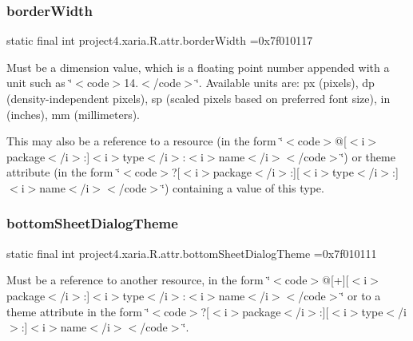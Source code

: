 \subsubsection{\texorpdfstring{border\+Width}{borderWidth}}
{\footnotesize\ttfamily static final int project4.\+xaria.\+R.\+attr.\+border\+Width =0x7f010117\hspace{0.3cm}{\ttfamily [static]}}

Must be a dimension value, which is a floating point number appended with a unit such as \char`\"{}$<$code$>$14.\+5sp$<$/code$>$\char`\"{}. Available units are\+: px (pixels), dp (density-\/independent pixels), sp (scaled pixels based on preferred font size), in (inches), mm (millimeters). 

This may also be a reference to a resource (in the form \char`\"{}$<$code$>$@\mbox{[}$<$i$>$package$<$/i$>$\+:\mbox{]}$<$i$>$type$<$/i$>$\+:$<$i$>$name$<$/i$>$$<$/code$>$\char`\"{}) or theme attribute (in the form \char`\"{}$<$code$>$?\mbox{[}$<$i$>$package$<$/i$>$\+:\mbox{]}\mbox{[}$<$i$>$type$<$/i$>$\+:\mbox{]}$<$i$>$name$<$/i$>$$<$/code$>$\char`\"{}) containing a value of this type. \mbox{\label{classproject4_1_1xaria_1_1R_1_1attr_ae6a88102a1ce06b9b5520fc892ddcf76}} 
\subsubsection{\texorpdfstring{bottom\+Sheet\+Dialog\+Theme}{bottomSheetDialogTheme}}
{\footnotesize\ttfamily static final int project4.\+xaria.\+R.\+attr.\+bottom\+Sheet\+Dialog\+Theme =0x7f010111\hspace{0.3cm}{\ttfamily [static]}}

Must be a reference to another resource, in the form \char`\"{}$<$code$>$@\mbox{[}+\mbox{]}\mbox{[}$<$i$>$package$<$/i$>$\+:\mbox{]}$<$i$>$type$<$/i$>$\+:$<$i$>$name$<$/i$>$$<$/code$>$\char`\"{} or to a theme attribute in the form \char`\"{}$<$code$>$?\mbox{[}$<$i$>$package$<$/i$>$\+:\mbox{]}\mbox{[}$<$i$>$type$<$/i$>$\+:\mbox{]}$<$i$>$name$<$/i$>$$<$/code$>$\char`\"{}. \mbox{\label{classproject4_1_1xaria_1_1R_1_1attr_a15c9db50a7f3e3717f51e1b9d63791db}} 
